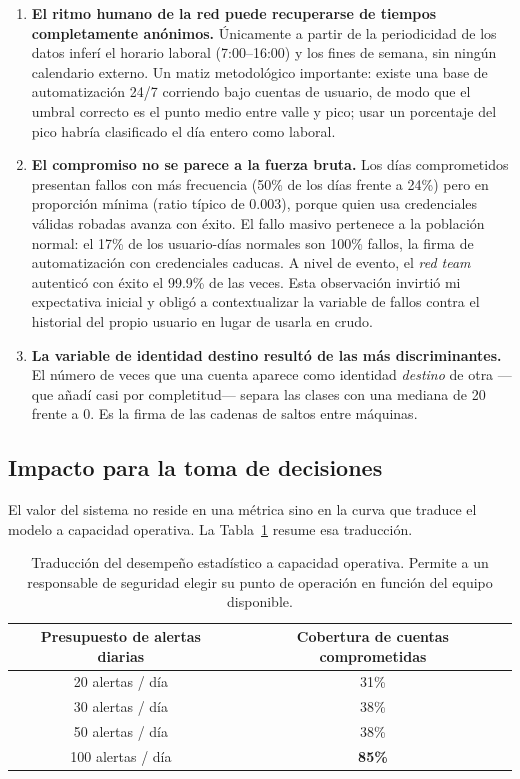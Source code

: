 \documentclass[12pt, a4paper]{article}
\begin{document}
\begin{enumerate}[leftmargin=1.5cm]
  \item \textbf{El ritmo humano de la red puede recuperarse de tiempos completamente anónimos.}
        Únicamente a partir de la periodicidad de los datos inferí el horario laboral (7:00--16:00)
        y los fines de semana, sin ningún calendario externo. Un matiz metodológico importante:
        existe una base de automatización 24/7 corriendo bajo cuentas de usuario, de modo que el
        umbral correcto es el punto medio entre valle y pico; usar un porcentaje del pico habría
        clasificado el día entero como laboral.
  \item \textbf{El compromiso no se parece a la fuerza bruta.} Los días comprometidos presentan
        fallos con más frecuencia (50\% de los días frente a 24\%) pero en proporción mínima (ratio
        típico de 0.003), porque quien usa credenciales válidas robadas avanza con éxito. El fallo
        masivo pertenece a la población normal: el 17\% de los usuario-días normales son 100\%
        fallos, la firma de automatización con credenciales caducas. A nivel de evento, el
        \textit{red team} autenticó con éxito el 99.9\% de las veces. Esta observación invirtió mi
        expectativa inicial y obligó a contextualizar la variable de fallos contra el historial del
        propio usuario en lugar de usarla en crudo.
  \item \textbf{La variable de identidad destino resultó de las más discriminantes.} El número de
        veces que una cuenta aparece como identidad \textit{destino} de otra ---que añadí casi por
        completitud--- separa las clases con una mediana de 20 frente a 0. Es la firma de las cadenas
        de saltos entre máquinas.
\end{enumerate}

\subsection{Impacto para la toma de decisiones}

El valor del sistema no reside en una métrica sino en la curva que traduce el modelo a capacidad
operativa. La Tabla~\ref{tab:negocio} resume esa traducción.

\begin{table}[!htb]
\centering
\small
\setlength{\tabcolsep}{8pt}
\begin{tabular}{cc}
\toprule
\textbf{Presupuesto de alertas diarias} & \textbf{Cobertura de cuentas comprometidas} \\
\midrule
20 alertas / día  & 31\% \\
30 alertas / día  & 38\% \\
50 alertas / día  & 38\% \\
100 alertas / día & \textbf{85\%} \\
\bottomrule
\end{tabular}
\caption{Traducción del desempeño estadístico a capacidad operativa. Permite a un responsable de
seguridad elegir su punto de operación en función del equipo disponible.}
\label{tab:negocio}
\end{table}
\end{document}
